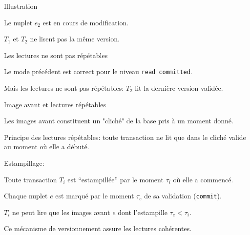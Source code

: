 \begin{frame}{Illustration}

Le nuplet $e_2$ est en cours de modification.


\medskip


\vfill

$T_1$ et $T_2$ ne lisent pas la même version. 


\end{frame}


\begin{frame}{Les lectures ne sont pas répétables}

Le mode précédent est correct pour le niveau \texttt{read committed}.


\vfill




\vfill

\begin{blocgauche}
Mais les lectures ne sont pas répétables: $T_2$ lit la dernière version validée.
\end{blocgauche}
\end{frame}


\begin{frame}{Image avant et lectures répétables}

Les images avant constituent un "cliché" de la base pris à un moment donné.

\vfill

\alert{Principe des lectures répétables}: 
 toute transaction ne lit que dans le cliché valide au moment où elle a débuté.
 
\vfill

\alert{Estampillage}: 

\begin{redbullet}
   \item Toute transaction $T_i$ est ``estampillée'' par le moment $\tau_i$
     où elle a commencé. 
     \item Chaque nuplet $e$ est marqué par le moment $\tau_e$
         de sa validation (\texttt{commit}).
      \item $T_i$ ne peut lire que les images avant $e$  dont l'estampille $\tau_e < \tau_i$.   
\end{redbullet}

\begin{blocgauche}
Ce mécanisme de \alert{versionnement} assure les lectures cohérentes.
\end{blocgauche}

\end{frame}


